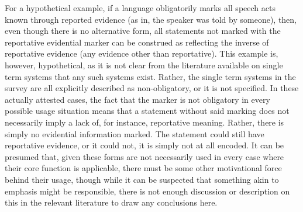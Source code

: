For a hypothetical example, if a language obligatorily marks all speech acts known through reported evidence (as in, the speaker was told by someone), then, even though there is no alternative form, all statements not marked with the reportative evidential marker can be construed as reflecting the inverse of reportative evidence (any evidence other than reportative). This example is, however, hypothetical, as it is not clear from the literature available on single term systems that any such systems exist. Rather, the single term  systems in the survey are all explicitly described as non-obligatory, or it is not specified. In these actually attested cases, the fact that the marker is not obligatory in every possible usage situation means that a statement without said marking does not necessarily imply a lack of, for instance, reportative meaning. Rather, there is simply no evidential information marked. The statement could still have reportative evidence, or it could not, it is simply not at all encoded. It can be presumed that, given these forms are not necessarily used in every case where their core function is applicable, there must be some other motivational force behind their usage, though while it can be suspected that something akin to emphasis might be responsible, there is not enough discussion or description on this in the relevant literature to draw any conclusions here.

